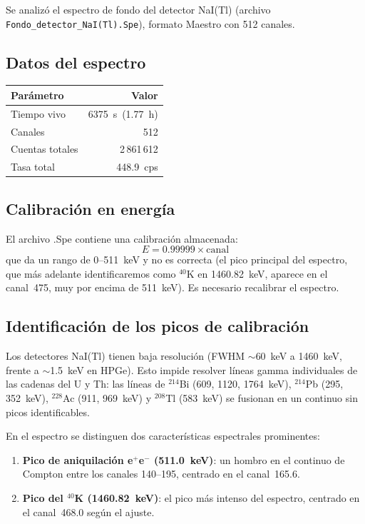 \documentclass[10pt,a4paper]{article}
\begin{document}
Se analiz\'o el espectro de fondo del detector NaI(Tl) (archivo
\texttt{Fondo\_detector\_NaI(Tl).Spe}), formato Maestro con 512 canales.

\subsection{Datos del espectro}

\begin{center}
\begin{tabular}{lr}
\hline
Par\'ametro & Valor \\
\hline
Tiempo vivo & 6375~s~(1.77~h) \\
Canales & 512 \\
Cuentas totales & 2\,861\,612 \\
Tasa total & 448.9~cps \\
\hline
\end{tabular}
\end{center}

\subsection{Calibraci\'on en energ\'ia}

El archivo .Spe contiene una calibraci\'on almacenada:
\[
E = 0.99999 \times \text{canal}
\]
que da un rango de 0--511~keV y no es correcta (el pico principal del espectro, que m\'as
adelante identificaremos como $^{40}$K en 1460.82~keV, aparece en el canal~475, muy por
encima de 511~keV). Es necesario recalibrar el espectro.

\subsection{Identificaci\'on de los picos de calibraci\'on}

Los detectores NaI(Tl) tienen baja resoluci\'on (FWHM $\sim$60~keV a 1460~keV, frente a
$\sim$1.5~keV en HPGe). Esto impide resolver l\'ineas gamma individuales de las cadenas
del U y Th: las l\'ineas de $^{214}$Bi (609, 1120, 1764~keV), $^{214}$Pb (295, 352~keV),
$^{228}$Ac (911, 969~keV) y $^{208}$Tl (583~keV) se fusionan en un continuo sin picos
identificables.

En el espectro se distinguen dos caracter\'isticas espectrales prominentes:

\begin{enumerate}
    \item \textbf{Pico de aniquilaci\'on e$^+$e$^-$ (511.0~keV)}: un hombro en el continuo
          de Compton entre los canales 140--195, centrado en el canal~165.6.
    \item \textbf{Pico del $^{40}$K (1460.82~keV)}: el pico m\'as intenso del espectro,
          centrado en el canal~468.0 seg\'un el ajuste.
\end{enumerate}
\end{document}

